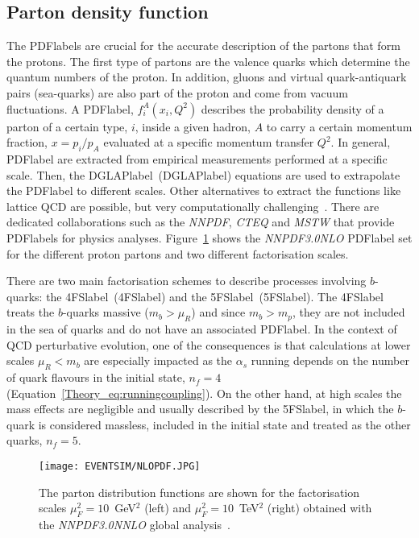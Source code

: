 \subsection{Parton density function}

The \acrshort{PDFlabel}s are crucial for the accurate description of the partons that form the protons. The first type of partons are the valence quarks which determine the quantum numbers of the proton. In addition, gluons and virtual quark-antiquark pairs (sea-quarks) are also part of the proton and come from vacuum fluctuations. A \acrshort{PDFlabel}, $f_i^A(x_i,Q^2)$ describes the probability density of a parton of a certain type, $i$, inside a given hadron, $A$ to carry a certain momentum fraction, $x=p_i/p_A$ evaluated at a specific momentum transfer $Q^2$. In general, \acrshort{PDFlabel} are extracted from empirical measurements performed at a specific scale. Then, the \acrlong{DGLAPlabel}~(\acrshort{DGLAPlabel}) equations are used to extrapolate the \acrshort{PDFlabel} to different scales. Other alternatives to extract the functions like lattice \acrshort{QCD} are possible, but very computationally challenging~\cite{Bhat_2021}.
There are dedicated collaborations such as the \textit{NNPDF}, \textit{CTEQ} and \textit{MSTW} that provide~\cite{Ball_2015,LesHouches,Martin_2009}
 \acrshort{PDFlabel}s for physics analyses. Figure~\ref{figEVNTSIM:PDF} shows the \textit{NNPDF3.0NLO} \acrshort{PDFlabel} set for the different proton partons and two different factorisation scales.

 There are two main factorisation schemes to describe processes involving $b$-quarks: the \acrlong{4FSlabel}~(\acrshort{4FSlabel}) and the \acrlong{5FSlabel}~(\acrshort{5FSlabel}). The \acrshort{4FSlabel} treats the $b$-quarks massive ($m_b>\mu_R$) and since $m_b>m_p$, they are not included in the sea of quarks and do not have an associated \acrshort{PDFlabel}. In the context of \acrshort{QCD} perturbative evolution, one of the consequences is that calculations at lower scales $\mu_R<m_b$ are especially impacted as the $\alpha_s$ running depends on the number of quark flavours in the initial state, $n_f=4$ (Equation~\ref{Theory_eq:runningcoupling}). On the other hand, at high scales the mass effects are negligible and usually described by the \acrshort{5FSlabel}, in which the $b$-quark is considered massless, included in the initial state and treated as the other quarks, $n_f=5$. 

 \begin{figure}[hbtp]
    \RawFloats
    \begin{center}
    \texttt{[image: EVENTSIM/NLOPDF.JPG]}
    \caption{
        The parton distribution functions are shown for the factorisation scales $\mu_F^2=10$~GeV$^2$ (left) and $\mu_F^2=10$~TeV$^2$ (right) obtained with the \textit{NNPDF3.0NNLO} global analysis~\cite{Ball_2017}.}
    \label{figEVNTSIM:PDF}
    \end{center}
\end{figure}

